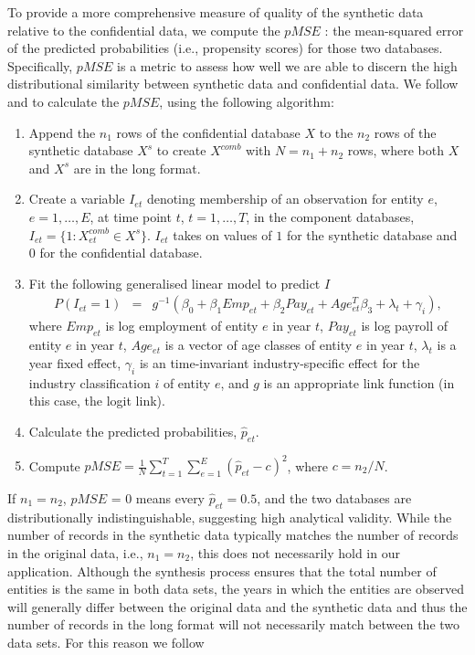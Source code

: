 \documentclass[10pt]{article}
\begin{document}
To provide a more comprehensive measure of  quality of the synthetic data relative to the confidential data, we compute the $pMSE$ \parencite[propensity score mean-squared error,][]{Woo_Reiter_Oganian_Karr_2009,SnokeSlavkovic2018,Snoke_RSSA2018}: the mean-squared error of the predicted probabilities (i.e., propensity scores) for those two databases. Specifically, $pMSE$ is a metric to assess how well we are able to discern the high distributional similarity between synthetic data and confidential data. We follow  \textcite{Woo_Reiter_Oganian_Karr_2009} and \textcite{SnokeSlavkovic2018} to calculate the $pMSE$, using the following algorithm:  
\begin{enumerate}
    \item Append the $n_1$ rows of the confidential database $X$ to the $n_2$ rows of the synthetic database $X^s$ to create $X^{comb}$ with $N=n_1 + n_2$ rows, where both $X$ and $X^s$ are in the long format.
    \item Create a variable $I_{et}$ denoting membership of an observation for entity $e$, $e=1,\ldots,E$, at time point $t$, $t=1,\ldots,T$, in the component databases,  $I_{et}=\{1: X^{comb}_{et} \in X^s\}$. $I_{et}$ takes on values of $1$ for the synthetic database and $0$ for the confidential database. 
    \item Fit the following generalised linear model to predict $I$
    \begin{eqnarray}	
        P(I_{et}=1) & = &g^{-1}(\beta_0 + \beta_{1} Emp_{et} + \beta_{2} Pay_{et} + Age_{et}^{T}\beta_{3} + \lambda_t + \gamma_i), \label{pMSE}
     \end{eqnarray}
         where $Emp_{et}$ is  log employment  of entity $e$ in year $t$, $Pay_{et}$ is  log payroll of entity $e$ in year $t$, $Age_{et}$ is a vector of age classes of entity $e$ in year $t$, $\lambda_t$ is a year fixed effect, $\gamma_i$ is an time-invariant industry-specific effect for the industry classification $i$ of entity $e$, and $g$ is an appropriate link function (in this case, the logit link).
\item Calculate the predicted probabilities, $\hat{p}_{et}$.
    \item Compute  $pMSE=\frac{1}{N}\sum_{t=1}^T\sum_{e=1}^E(\hat{p}_{et} - c)^2$, where $c=n_2/N$.
\end{enumerate}
If $n_1 = n_2$, $pMSE$ = 0 means every $\hat{p}_{et}= 0.5$, and the two databases are distributionally indistinguishable, suggesting  high analytical validity. While the number of records in the synthetic data typically matches the number of records in the original data, i.e., $n_1 = n_2$, this does not necessarily hold in our application. Although the synthesis process ensures that the total number of entities is the same in both data sets, the years in which the entities are observed will generally differ between the original data and the synthetic data and thus the number of records in the long format will not necessarily match between the two data sets. For this reason we follow 
\end{document}
